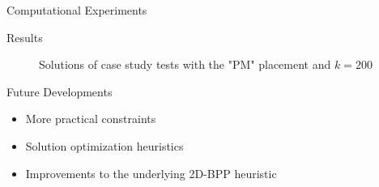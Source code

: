 \documentclass{beamer}
\begin{document}
    \begin{frame}{Computational Experiments}
        
    \end{frame}

    \begin{frame}{Results}
        \begin{figure}
            \centering
            \caption{Solutions of case study tests with the "PM" placement and $k=200$}
            \label{fig:usecase_tests}
        \end{figure}
    \end{frame}

    \begin{frame}{Future Developments}
        \begin{itemize}
            \item More practical constraints
            \item Solution optimization heuristics
            \item Improvements to the underlying 2D-BPP heuristic
        \end{itemize}
    \end{frame}
\end{document}
